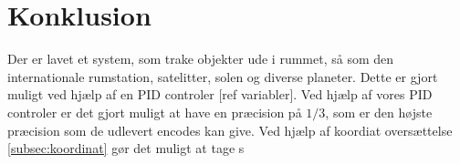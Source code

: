 \section{Konklusion}
Der er lavet et system, som trake objekter ude i rummet, så som den internationale rumstation, satelitter, solen og diverse planeter. Dette er gjort muligt ved hjælp af en PID controler [ref variabler]. Ved hjælp af vores PID controler er det gjort muligt at have en præcision på $1/3$, som er den højste præcision som de udlevert encodes kan give. Ved hjælp af koordiat oversættelse \ref{subsec:koordinat} gør det muligt at tage s